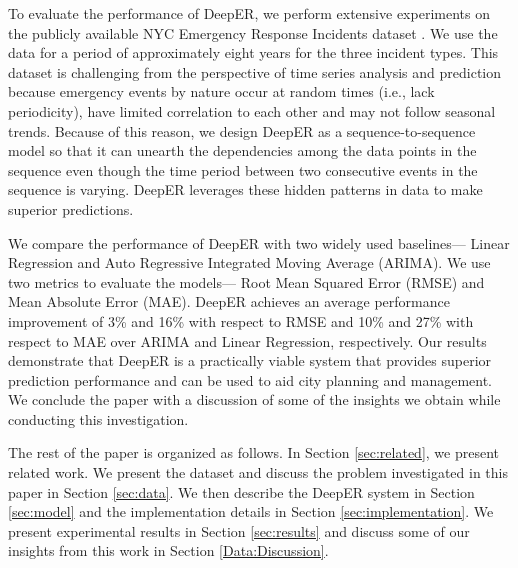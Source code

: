 To evaluate the performance of DeepER, we perform extensive experiments on the publicly available NYC Emergency Response Incidents dataset \cite{nycopendata}. We use the data for a period of approximately eight years for the three incident types. This dataset is challenging from the perspective of time series analysis and prediction because emergency events by nature occur at random times (i.e., lack periodicity), have limited correlation to each other and may not follow seasonal trends. Because of this reason, we design DeepER as a sequence-to-sequence model so that it can unearth  the dependencies among the data points in the sequence even though the time period between two consecutive events in the sequence is varying. DeepER leverages these hidden patterns in data to make superior predictions.


We compare the performance of DeepER with two widely used baselines--- Linear Regression and Auto Regressive Integrated Moving Average (ARIMA). We use two metrics to evaluate the models--- Root Mean Squared Error (RMSE) and Mean Absolute Error (MAE). DeepER achieves an average performance improvement of 3\% and 16\% with respect to RMSE and 10\% and 27\% with respect to MAE  over ARIMA and Linear Regression, respectively. Our results demonstrate that DeepER is a practically viable system that provides superior prediction performance and can be used to aid city planning and management. We conclude the paper with a discussion of some of the insights we obtain while conducting this investigation.

The rest of the paper is organized as follows. In Section \ref{sec:related}, we present related work. We present  the dataset and discuss the problem investigated in this paper in Section \ref{sec:data}. We then describe the DeepER system in Section \ref{sec:model} and the implementation details in Section \ref{sec:implementation}. We present experimental results in Section \ref{sec:results} and discuss some of our insights from this work in Section \ref{Data:Discussion}.

